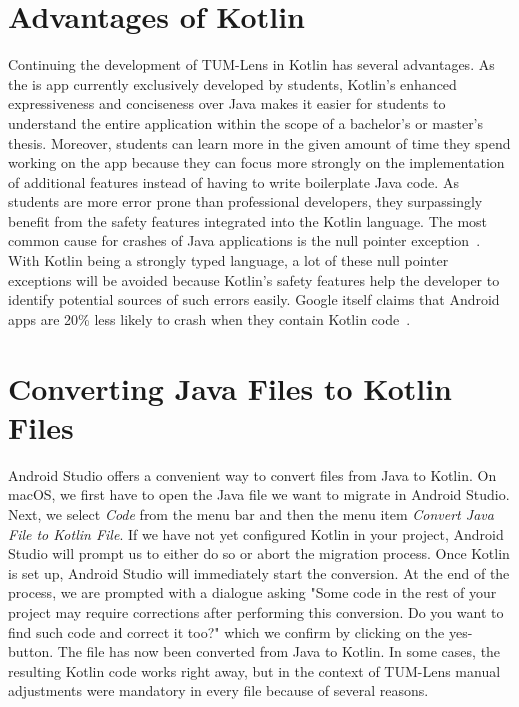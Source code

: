 \documentclass[
			   fontsize=11pt,
               paper=a4,
               bibliography=totoc,
               idxtotoc,
               headsepline,
               footsepline,
               footinclude=false,
               BCOR=12mm,
               DIV=13,
               openany,   %
               ]
               {scrbook}
\begin{document}
\section{Advantages of Kotlin}
Continuing the development of TUM-Lens in Kotlin has several advantages. As the is app currently exclusively developed by students, Kotlin's enhanced expressiveness and conciseness over Java makes it easier for students to understand the entire application within the scope of a bachelor's or master's thesis. Moreover, students can learn more in the given amount of time they spend working on the app because they can focus more strongly on the implementation of additional features instead of having to write boilerplate Java code. As students are more error prone than professional developers, they surpassingly benefit from the safety features integrated into the Kotlin language. The most common cause for crashes of Java applications is the null pointer exception~\cite{nullPointerSamebug, nullPointerOverops}. With Kotlin being a strongly typed language, a lot of these null pointer exceptions will be avoided because Kotlin's safety features help the developer to identify potential sources of such errors easily. Google itself claims that Android apps are 20\% less likely to crash when they contain Kotlin code~\cite{kotlinFirst}.

\section{Converting Java Files to Kotlin Files}

Android Studio offers a convenient way to convert files from Java to Kotlin. On macOS, we first have to open the Java file we want to migrate in Android Studio. Next, we select \textit{Code} from the menu bar and then the menu item \textit{Convert Java File to Kotlin File}. If we have not yet configured Kotlin in your project, Android Studio will prompt us to either do so or abort the migration process. Once Kotlin is set up, Android Studio will immediately start the conversion. At the end of the process, we are prompted with a dialogue asking "Some code in the rest of your project may require corrections after performing this conversion. Do you want to find such code and correct it too?" which we confirm by clicking on the yes-button. The file has now been converted from Java to Kotlin. In some cases, the resulting Kotlin code works right away, but in the context of TUM-Lens manual adjustments were mandatory in every file because of several reasons. \\
\end{document}

